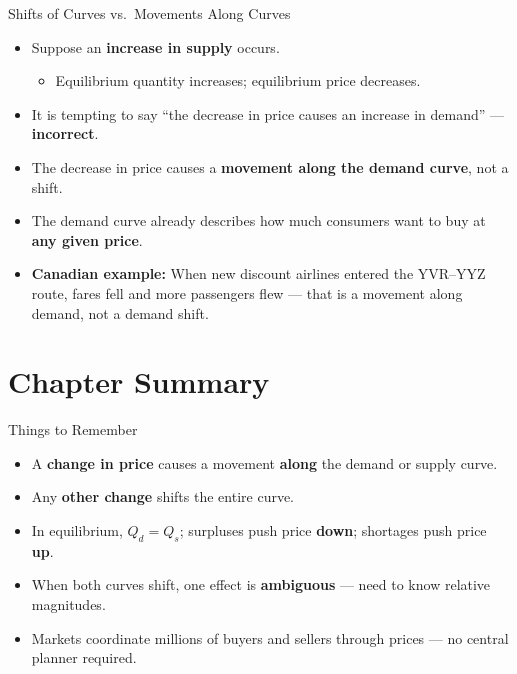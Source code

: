 \documentclass[aspectratio=169]{beamer}
\begin{document}
\begin{frame}{Shifts of Curves vs.\ Movements Along Curves}
\transfade
\begin{itemize}[<+->]
  \item Suppose an \textbf{increase in supply} occurs.
  \begin{itemize}[<+->]
    \item Equilibrium quantity increases; equilibrium price decreases.
  \end{itemize}
  \item It is tempting to say ``the decrease in price causes an increase in demand'' --- \textbf{incorrect}.
  \item The decrease in price causes a \textbf{movement along the demand curve}, not a shift.
  \item The demand curve already describes how much consumers want to buy at \textbf{any given price}.
  \item \textbf{Canadian example:} When new discount airlines entered the YVR--YYZ route, fares fell and more passengers flew --- that is a movement along demand, not a demand shift.
\end{itemize}
\end{frame}

\section{Chapter Summary}

\begin{frame}{Things to Remember}
\transfade
\begin{itemize}[<+->]
  \item A \textbf{change in price} causes a movement \textbf{along} the demand or supply curve.
  \item Any \textbf{other change} shifts the entire curve.
  \item In equilibrium, $Q_d = Q_s$; surpluses push price \textbf{down}; shortages push price \textbf{up}.
  \item When both curves shift, one effect is \textbf{ambiguous} --- need to know relative magnitudes.
  \item Markets coordinate millions of buyers and sellers through prices --- no central planner required.
\end{itemize}
\end{frame}
\end{document}
